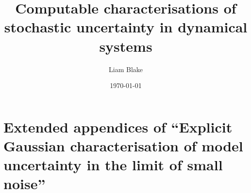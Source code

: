 \documentclass[draft, 12pt, a4paper, twoside]{book}
\title{Computable characterisations of stochastic uncertainty in dynamical systems}
\author{Liam Blake}
\date{\today}
\begin{document}
\frontmatter

\maketitle

\tableofcontents
\listoftables
\listoffigures






\mainmatter









\appendix


%
\chapter{Extended appendices of ``Explicit Gaussian characterisation of model uncertainty in the limit of small noise''}


\backmatter



\end{document}
